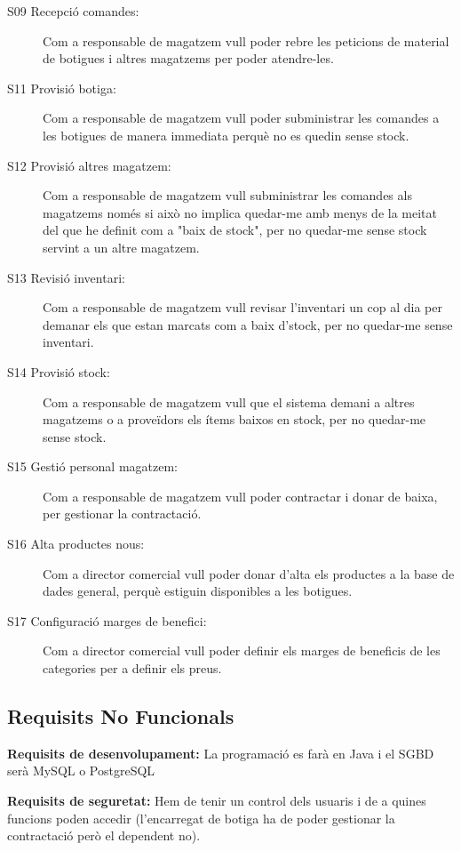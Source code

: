\documentclass[a4paper,12pt]{article}
\begin{document}
\begin{description}
	\item[S09 Recepció comandes:] Com a responsable de magatzem vull poder rebre les peticions de material de botigues i altres magatzems per poder atendre-les.
	\item[S11 Provisió botiga:] Com a responsable de magatzem vull poder subministrar les comandes a les botigues de manera immediata perquè no es quedin sense stock.
	\item[S12 Provisió altres magatzem:] Com a responsable de magatzem vull subministrar les comandes als magatzems només si això no implica quedar-me amb menys de la meitat del que he definit com a "baix de stock", per no quedar-me sense stock servint a un altre magatzem.
	\item[S13 Revisió inventari:] Com a responsable de magatzem vull revisar l'inventari un cop al dia per demanar els que estan marcats com a baix d'stock, per no quedar-me sense inventari.
	\item[S14 Provisió stock:] Com a responsable de magatzem vull que el sistema demani a altres magatzems o a proveïdors els ítems baixos en stock, per no quedar-me sense stock.
	\item[S15 Gestió personal magatzem:] Com a responsable de magatzem vull poder contractar i donar de baixa, per gestionar la contractació.
\end{description}

\begin{description}
	\item[S16 Alta productes nous:] Com a director comercial vull poder donar d'alta els productes a la base de dades general, perquè estiguin disponibles a les botigues.
	\item[S17 Configuració marges de benefici:] Com a director comercial
	vull poder definir els marges de beneficis de les categories per a definir els preus.
\end{description}

\subsection{Requisits No Funcionals}
\textbf{Requisits de desenvolupament:} La programació es farà en Java i el SGBD serà MySQL o PostgreSQL

\textbf{Requisits de seguretat:} Hem de tenir un control dels usuaris i de a quines funcions poden accedir (l'encarregat de botiga ha de poder gestionar la contractació però el dependent no).
\end{document}
